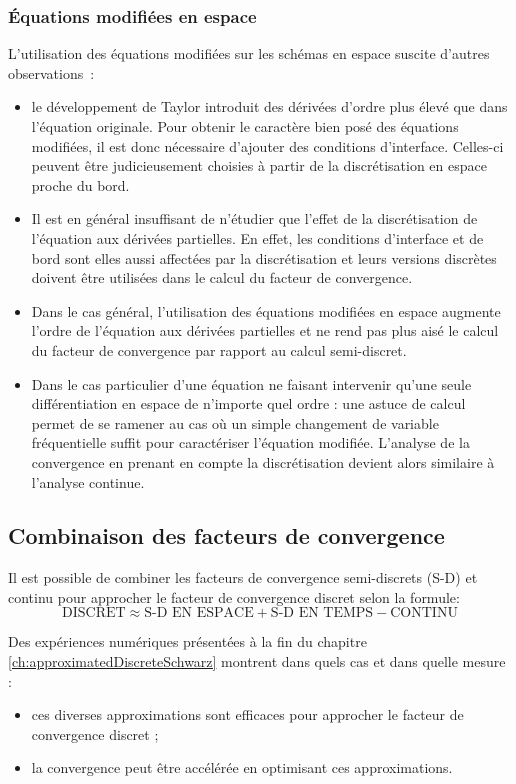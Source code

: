 \subsubsection*{Équations modifiées en espace}
L'utilisation des équations modifiées sur les schémas en espace
suscite d'autres observations~:
\begin{itemize}
	\item 
	le développement de Taylor introduit des dérivées
d'ordre plus élevé que dans l'équation originale. Pour
obtenir le caractère bien posé des équations modifiées, il est donc
nécessaire d'ajouter des conditions d'interface. Celles-ci peuvent
être judicieusement choisies à partir de la discrétisation en espace
proche du bord.
	\item Il est en général insuffisant de n'étudier que
		l'effet de la discrétisation de
		l'équation aux dérivées partielles. En effet,
		les conditions d'interface et de bord sont
		elles aussi affectées par la discrétisation et
		leurs versions discrètes doivent être utilisées
		dans le calcul du facteur de convergence.
	\item Dans le cas général, l'utilisation des équations
	modifiées en espace augmente l'ordre de l'équation aux
	dérivées partielles et ne rend pas plus aisé
	le calcul du facteur de convergence par rapport
		au calcul semi-discret.
	\item Dans le cas particulier d'une équation ne faisant
	intervenir
	qu'une seule différentiation en espace de n'importe
	quel ordre :
	une astuce de calcul permet de se ramener au cas où un simple
	changement de variable fréquentielle suffit pour caractériser
		l'équation modifiée.
	L'analyse de la convergence en prenant en compte la
		discrétisation devient alors similaire à l'analyse
		continue.
\end{itemize}
%
\subsection*{Combinaison des facteurs de convergence}
Il est possible de combiner les facteurs
de convergence semi-discrets (S-D) et continu pour approcher le
facteur de convergence discret selon la formule:
\begin{equation}
	\text{DISCRET} \approx
	\text{S-D EN ESPACE} +
	\text{S-D EN TEMPS} -
	\text{CONTINU}
\end{equation}
%
\par
Des expériences numériques présentées à la fin
du chapitre \ref{ch:approximatedDiscreteSchwarz} montrent dans quels
cas et dans quelle mesure :
\begin{itemize}
	\item
ces diverses approximations sont efficaces pour approcher le facteur
de convergence discret ;
	\item
la convergence
peut être accélérée en optimisant ces approximations.
\end{itemize}

